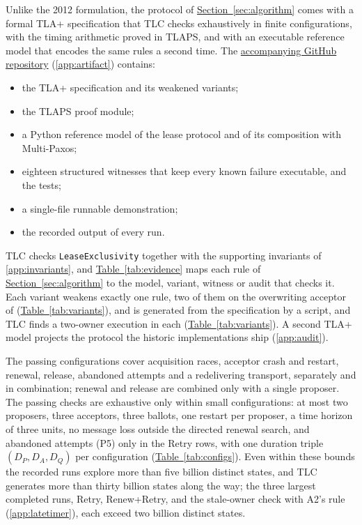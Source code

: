 \documentclass[final,5p,times,twocolumn,number]{elsarticle}
\newcommand{\code}[1]{\texttt{#1}}
\newcommand{\secref}[1]{\hyperref[#1]{Section~\ref*{#1}}}
\newcommand{\tabref}[1]{\hyperref[#1]{Table~\ref*{#1}}}
\begin{document}
Unlike the 2012 formulation, the protocol of \secref{sec:algorithm} comes with a formal TLA+ specification that TLC checks exhaustively in finite configurations, with the timing arithmetic proved in TLAPS, and with an executable reference model that encodes the same rules a second time.  The \href{https://github.com/mtrencseni/paxoslease-revisited}{accompanying GitHub repository} (\ref{app:artifact}) contains:
\begin{itemize}\itemsep0.1em
\item the TLA+ specification and its weakened variants;
\item the TLAPS proof module;
\item a Python reference model of the lease protocol and of its composition with Multi-Paxos;
\item eighteen structured witnesses that keep every known failure executable, and the tests;
\item a single-file runnable demonstration;
\item the recorded output of every run.
\end{itemize}

TLC checks \code{LeaseExclusivity} together with the supporting invariants of \ref{app:invariants}, and \tabref{tab:evidence} maps each rule of \secref{sec:algorithm} to the model, variant, witness or audit that checks it.  Each variant weakens exactly one rule, two of them on the overwriting acceptor of \cite{ref1} (\tabref{tab:variants}), and is generated from the specification by a script, and TLC finds a two-owner execution in each (\tabref{tab:variants}).  A second TLA+ model projects the protocol the historic implementations ship (\ref{app:audit}).

The passing configurations cover acquisition races, acceptor crash and restart, renewal, release, abandoned attempts and a redelivering transport, separately and in combination; renewal and release are combined only with a single proposer.  The passing checks are exhaustive only within small configurations: at most two proposers, three acceptors, three ballots, one restart per proposer, a time horizon of three units, no message loss outside the directed renewal search, and abandoned attempts (P5) only in the Retry rows, with one duration triple $(D_P, D_A, D_Q)$ per configuration (\tabref{tab:configs}).  Even within these bounds the recorded runs explore more than five billion distinct states, and TLC generates more than thirty billion states along the way; the three largest completed runs, Retry, Renew+Retry, and the stale-owner check with A2's rule (\ref{app:latetimer}), each exceed two billion distinct states.
\end{document}
